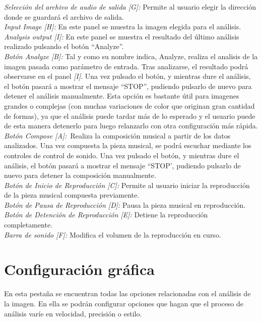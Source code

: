 		\noindent\textit{Selección del archivo de audio de salida [G]:} Permite al usuario elegir la dirección donde se guardará el archivo de salida.\\
		
		\noindent\textit{Input Image [H]:} En este panel se muestra la imagen elegida para el análisis.\\
		
		\noindent\textit{Analysis output [I]:} En este panel se muestra el resultado del último análisis realizado pulsando el botón ``Analyze''.\\
		
		\noindent\textit{Botón Analyze [B]:} Tal y como su nombre indica, Analyze, realiza el analisis de la imagen pasada como parámetro de entrada. Tras analizarse, el resultado podrá observarse en el panel \textit{[I]}. Una vez pulsado el botón, y mientras dure el análisis, el botón pasará a mostrar el mensaje ``STOP'', pudiendo pulsarlo de nuevo para detener el análisis manualmente. Esta opción es bastante útil para imagenes grandes o complejas (con muchas variaciones de color que originan gran cantidad de formas), ya que el análisis puede tardar más de lo esperado y el usuario puede de esta manera detenerlo para luego relanzarlo con otra configuración más rápida.\\
		
		\noindent\textit{Botón Compose [A]:}\ Realiza la composición musical a partir de los datos analizados. Una vez compuesta la pieza musical, se podrá escuchar mediante los controles de control de sonido. Una vez pulsado el botón, y mientras dure el análisis, el botón pasará a mostrar el mensaje ``STOP', pudiendo pulsarlo de nuevo para detener la composición manualmente.\\
		
		\noindent\textit{Botón de Inicio de Reproducción [C]:} Permite al usuario iniciar la reproducción de la pieza musical compuesta previamente.\\
		
		\noindent\textit{Botón de Pausa de Reproducción [D]:} Pausa la pieza musical en reproducción.\\
		
		\noindent\textit{Botón de Detención de Reproducción [E]:} Detiene la reproducción completamente.\\
		
		\noindent\textit{Barra de sonido [F]:} Modifica el volumen de la reproducción en curso.

		
	\section{Configuración gráfica}
		En esta pestaña se encuentran todas las opciones relacionadas con el análisis de la imagen. En ella se podrán configurar opciones que hagan que el proceso de análisis varíe en velocidad, precisión o estilo.\\
		
